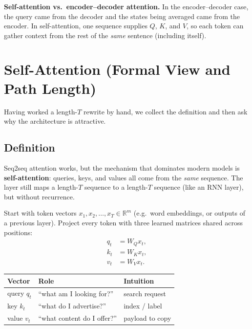 \documentclass[11pt]{article}
\begin{document}
\noindent\textbf{Self-attention vs.\ encoder--decoder attention.}
In the encoder--decoder case, the query came from the decoder and the
states being averaged came from the encoder. In self-attention, one
sequence supplies \(Q\), \(K\), and \(V\), so each token can gather
context from the rest of the \emph{same} sentence (including itself).

\section{Self-Attention (Formal View and Path Length)}

Having worked a length-\(T\) rewrite by hand, we collect the definition and
then ask why the architecture is attractive.

\subsection{Definition}


Seq2seq attention works, but the mechanism that dominates modern models is
\textbf{self-attention}: queries, keys, and values all come from the
\emph{same} sequence. The layer still maps a length-\(T\) sequence to a
length-\(T\) sequence (like an RNN layer), but without recurrence.

Start with token vectors \(x_1,x_2,\ldots,x_T\in\mathbb{R}^{m}\) (e.g.\ word
embeddings, or outputs of a previous layer). Project every token with three
learned matrices shared across positions:
\begin{align}
  q_t &= W_Q x_t, \label{eq:q} \\
  k_t &= W_K x_t, \label{eq:k} \\
  v_t &= W_V x_t. \label{eq:v}
\end{align}

\begin{center}
\begin{tabular}{@{}lll@{}}
\toprule
Vector & Role & Intuition \\
\midrule
query \(q_t\)  & ``what am I looking for?''   & search request \\
key \(k_t\)    & ``what do I advertise?''     & index / label \\
value \(v_t\)  & ``what content do I offer?'' & payload to copy \\
\bottomrule
\end{tabular}
\end{center}
\end{document}
